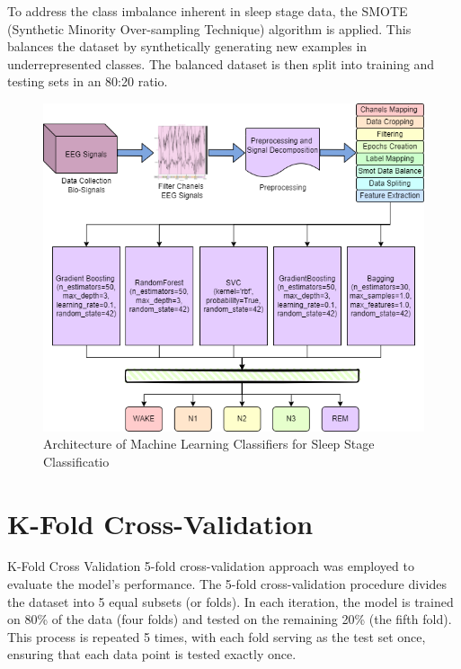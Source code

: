 To address the class imbalance inherent in sleep stage data, the SMOTE (Synthetic Minority Over-sampling Technique) algorithm is applied. This balances the dataset by synthetically generating new examples in underrepresented classes. The balanced dataset is then split into training and testing sets in an 80:20 ratio.  

\begin{figure}
	\centering
	\includegraphics[width=0.9\linewidth]{"img/paper_1/Architechture1"}
	\caption{Architecture of Machine Learning Classifiers for Sleep Stage
		Classificatio}
	\label{fig:architechture1}
\end{figure}









\section{K-Fold Cross-Validation}

K-Fold Cross Validation  5-fold cross-validation approach was employed to evaluate the model's performance. The 5-fold cross-validation procedure divides the dataset into 5 equal subsets (or folds). In each iteration, the model is trained on 80\% of the data (four folds) and tested on the remaining 20\% (the fifth fold). This process is repeated 5 times, with each fold serving as the test set once, ensuring that each data point is tested exactly once.

